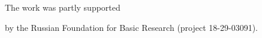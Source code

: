 








\Ack

\noindent

The work was partly supported

by the Russian Foundation for Basic Research (project 18-29-03091).



 





\renewcommand{\bibname}{\protect\rmfamily References}




